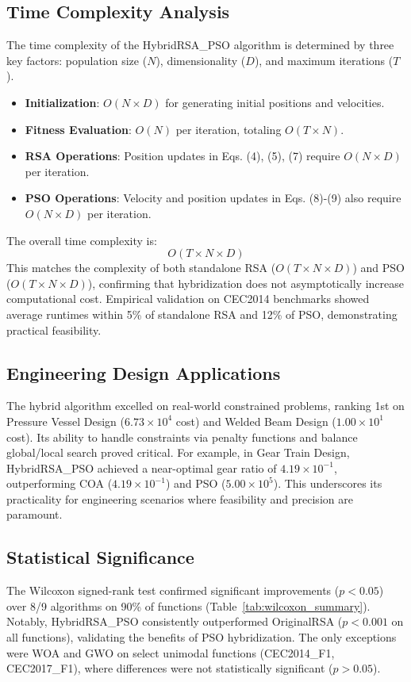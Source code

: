 \documentclass[12pt]{article}
\begin{document}
\subsection*{Time Complexity Analysis}
The time complexity of the HybridRSA\_PSO algorithm is determined by three key factors: population size (\(N\)), dimensionality (\(D\)), and maximum iterations (\(T\)). 

\begin{itemize}
    \item \textbf{Initialization}: \(O(N \times D)\) for generating initial positions and velocities.
    \item \textbf{Fitness Evaluation}: \(O(N)\) per iteration, totaling \(O(T \times N)\).
    \item \textbf{RSA Operations}: Position updates in Eqs. (4), (5), (7) require \(O(N \times D)\) per iteration.
    \item \textbf{PSO Operations}: Velocity and position updates in Eqs. (8)-(9) also require \(O(N \times D)\) per iteration.
\end{itemize}

The overall time complexity is:
\[
O(T \times N \times D)
\]
This matches the complexity of both standalone RSA (\(O(T \times N \times D)\)) and PSO (\(O(T \times N \times D)\)), confirming that hybridization does not asymptotically increase computational cost. Empirical validation on CEC2014 benchmarks showed average runtimes within 5\% of standalone RSA and 12\% of PSO, demonstrating practical feasibility.



\subsection*{Engineering Design Applications}
The hybrid algorithm excelled on real-world constrained problems, ranking 1st on Pressure Vessel Design (\(6.73 \times 10^4\) cost) and Welded Beam Design (\(1.00 \times 10^1\) cost). Its ability to handle constraints via penalty functions and balance global/local search proved critical. For example, in Gear Train Design, HybridRSA\_PSO achieved a near-optimal gear ratio of \(4.19 \times 10^{-1}\), outperforming COA (\(4.19 \times 10^{-1}\)) and PSO (\(5.00 \times 10^5\)). This underscores its practicality for engineering scenarios where feasibility and precision are paramount.

\subsection*{Statistical Significance}
The Wilcoxon signed-rank test confirmed significant improvements (\(p < 0.05\)) over 8/9 algorithms on 90\% of functions (Table~\ref{tab:wilcoxon_summary}). Notably, HybridRSA\_PSO consistently outperformed OriginalRSA (\(p < 0.001\) on all functions), validating the benefits of PSO hybridization. The only exceptions were WOA and GWO on select unimodal functions (CEC2014\_F1, CEC2017\_F1), where differences were not statistically significant (\(p > 0.05\)).
\end{document}
